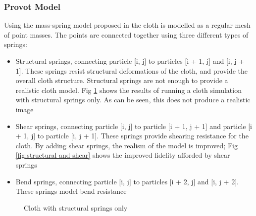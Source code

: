\subsubsection{Provot Model}
Using the mass-spring model proposed in \textcite{Provot2001} the cloth is modelled as a regular mesh of point masses. The points are connected together using three different types of springs:
\begin{itemize}
  \item{Structural springs, connecting particle [i, j] to particles [i + 1, j] and [i, j + 1]. These springs resist structural deformations of the cloth, and provide the overall cloth structure. Structural springs are not enough to provide a realistic cloth model. Fig \ref{fig:structural only} shows the results of running a cloth simulation with structural springs only. As can be seen, this does not produce a realistic image}
  \item{Shear springs, connecting particle [i, j] to particle [i + 1, j + 1] and particle [i + 1, j] to particle [i, j + 1]. These springs provide shearing resistance for the cloth. By adding shear springs, the realism of the model is improved; Fig \ref{fig:structural and shear} shows the improved fidelity afforded by shear springs}
  \item{Bend springs, connecting particle [i, j] to particles [i + 2, j] and [i, j + 2]. These springs model bend resistance}
\end{itemize}

\begin{figure}
\centering
{}
\caption[Cloth with structural springs only]{Cloth with structural springs only \parencite[2]{Lander2000}}
\label{fig:structural only}
\end{figure}

